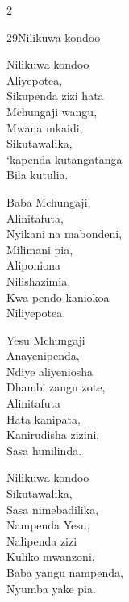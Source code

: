 \begin{multicols}{2}
\begin{hymn}{29}{Nilikuwa kondoo}{}
\begin{stanza}
Nilikuwa kondoo\\
Aliyepotea,\\
Sikupenda zizi hata\\
Mchungaji wangu,\\
Mwana mkaidi,\\
Sikutawalika,\\
`kapenda kutangatanga\\
Bila kutulia.
\end{stanza}
\begin{stanza}
Baba Mchungaji,\\
Alinitafuta,\\
Nyikani na mabondeni,\\
Milimani pia,\\
Aliponiona\\
Nilishazimia,\\
Kwa pendo kaniokoa\\
Niliyepotea.
\end{stanza}
\begin{stanza}
Yesu Mchungaji\\
Anayenipenda,\\
Ndiye aliyeniosha\\
Dhambi zangu zote,\\
Alinitafuta\\
Hata kanipata,\\
Kanirudisha zizini,\\
Sasa hunilinda.
\end{stanza}
\begin{stanza}
Nilikuwa kondoo\\
Sikutawalika,\\
Sasa nimebadilika,\\
Nampenda Yesu,\\
Nalipenda zizi\\
Kuliko mwanzoni,\\
Baba yangu nampenda,\\
Nyumba yake pia.
\end{stanza}
\end{hymn}


\end{multicols}
